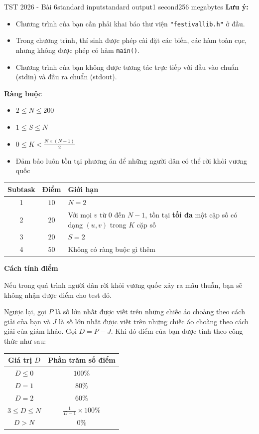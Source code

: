 \begin{problem}{TST 2026 - Bài 6}{standard input}{standard output}{1 second}{256 megabytes}
\textbf{Lưu ý:}
\begin{itemize}
   \item Chương trình của bạn cần phải khai báo thư viện \texttt{"festivallib.h"} ở đầu.
   \item Trong chương trình, thí sinh được phép cài đặt các biến, các hàm toàn cục, nhưng không được phép có hàm \texttt{main()}.
   \item Chương trình của bạn không được tương tác trực tiếp với đầu vào chuẩn (stdin) và đầu ra chuẩn (stdout).
\end{itemize}

\textbf{Ràng buộc}
\begin{itemize}
   \item $2\le N\le 200$
   \item $1\le S\le N$
   \item $0\le K<\frac{N\times (N-1)}2$
   \item Đảm bảo luôn tồn tại phương án để những người dân có thể rời khỏi vương quốc
\end{itemize}

\Scoring
\begin{center}
  \begin{tabular}{|c|c|l|} \hline
    \textbf{Subtask} & \textbf{Điểm} & \textbf{Giới hạn} \\ \hline
    1 & $10$ & $N=2$ \\ \hline
    2 & $20$ & Với mọi $v$ từ $0$ đến $N-1$, tồn tại \textbf{tối đa} một cặp số có dạng $(u,v)$ trong $K$ cặp số \\ \hline
    3 & $20$ & $S=2$ \\ \hline
    4 & $50$ & Không có ràng buộc gì thêm \\ \hline
  \end{tabular}
\end{center}

\textbf{Cách tính điểm}

Nếu trong quá trình người dân rời khỏi vương quốc xảy ra mâu thuẫn, bạn sẽ không nhận được điểm cho test đó.

Ngược lại, gọi $P$ là số lớn nhất được viết trên những chiếc áo choàng theo cách giải của bạn và $J$ là số lớn nhất được viết trên những chiếc áo choàng theo cách giải của giám khảo. Gọi $D=P-J$. Khi đó điểm của bạn được tính theo công thức như sau:

\begin{center}
  \begin{tabular}{|c|c|} \hline
    \textbf{Giá trị $D$} & \textbf{Phần trăm số điểm} \\ \hline
    $D\le 0$ & $100\%$ \\ \hline
    $D=1$ & $80\%$ \\ \hline
    $D=2$ & $60\%$ \\ \hline
    $3\le D\le N$ & $\frac{1}{D-1}\times 100\%$ \\ \hline
    $D\gt N$ & $0\%$ \\ \hline
  \end{tabular}
\end{center}


\end{problem}
